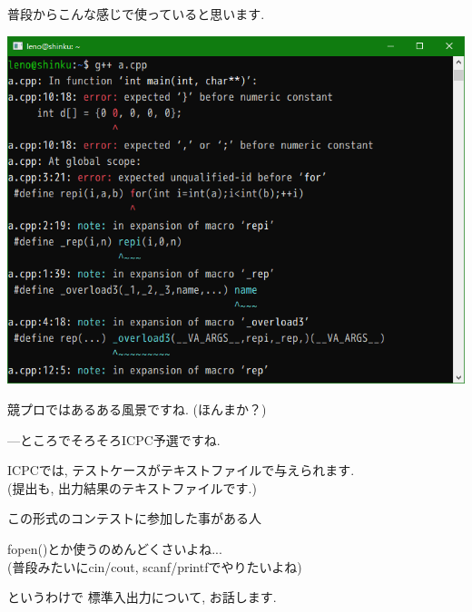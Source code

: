 \documentclass[uplatex, dvipdfmx, unicode]{beamer}
\begin{document}
\begin{frame}
  普段からこんな感じで使っていると思います.
  
  \centering
  \includegraphics[keepaspectratio, scale=.5]{./img/console.png}
\end{frame}

\begin{frame}
  競プロではあるある風景ですね. (ほんまか？)
\end{frame}

\begin{frame}
  ---ところでそろそろICPC予選ですね.
\end{frame}

\begin{frame}
  ICPCでは, テストケースがテキストファイルで与えられます.\\
  (提出も, 出力結果のテキストファイルです.)
\end{frame}

\begin{frame}{}
  \centering
  \Huge{この形式のコンテストに参加した事がある人\faHandPaperO}
\end{frame}

\begin{frame}{}
  fopen()とか使うのめんどくさいよね... \\
  (普段みたいにcin/cout, scanf/printfでやりたいよね)
\end{frame}

\begin{frame}{というわけで}
  標準入出力について, お話します.
\end{frame}
\end{document}
